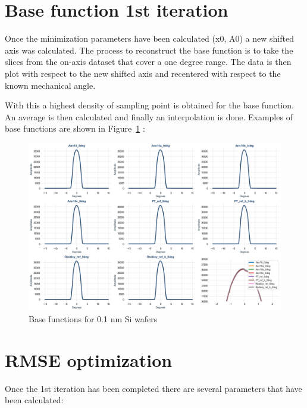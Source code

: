 \documentclass[
  letterpaper,
  DIV=11,
  numbers=noendperiod,
  oneside]{scrreprt}
\begin{document}
\hypertarget{base-function-1st-iteration}{%
\section{Base function 1st
iteration}\label{base-function-1st-iteration}}

Once the minimization parameters have been calculated (x0, A0) a new
shifted axis was calculated. The process to reconstruct the base
function is to take the slices from the on-axis dataset that cover a one
degree range. The data is then plot with respect to the new shifted axis
and recentered with respect to the known mechanical angle.

With this a highest density of sampling point is obtained for the base
function. An average is then calculated and finally an interpolation is
done. Examples of base functions are shown in Figure~\ref{fig-4-5} :

\begin{figure}

{\centering \includegraphics{notebooks/c_optimization_files/figure-pdf/fig-4-5-output-1.png}

}

\caption{\label{fig-4-5}Base functions for 0.1 nm Si wafers}

\end{figure}

\hypertarget{rmse-optimization}{%
\section{RMSE optimization}\label{rmse-optimization}}

Once the 1st iteration has been completed there are several parameters
that have been calculated:
\end{document}
